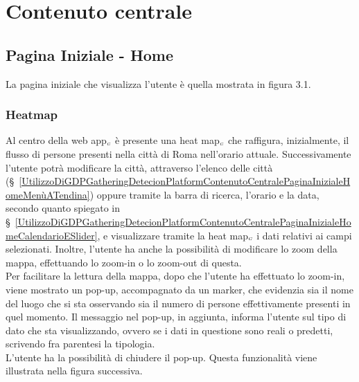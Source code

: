 \section{Contenuto centrale}\label{UtilizzoDiGDPGatheringDetecionPlatformContenutoCentrale}

\subsection{Pagina Iniziale - Home} \label{UtilizzoDiGDPGatheringDetecionPlatformContenutoCentralePaginaInizialeHome}
La pagina iniziale che visualizza l'utente è quella mostrata in figura 3.1.

\subsubsection{Heatmap}\label{UtilizzoDiGDPGatheringDetecionPlatformContenutoCentralePaginaInizialeHomeHeatmap}
Al centro della web app$_{\scaleto{G}{3pt}}$ è presente una heat map$_{\scaleto{G}{3pt}}$ che raffigura, inizialmente, il flusso di persone presenti nella città di Roma nell'orario attuale. Successivamente l'utente potrà modificare la città, attraverso l'elenco delle città (\S~\ref{UtilizzoDiGDPGatheringDetecionPlatformContenutoCentralePaginaInizialeHomeMenùATendina}) oppure tramite la barra di ricerca, l'orario e la data, secondo quanto spiegato in \S~\ref{UtilizzoDiGDPGatheringDetecionPlatformContenutoCentralePaginaInizialeHomeCalendarioESlider}, e visualizzare tramite la heat map$_{\scaleto{G}{3pt}}$ i dati relativi ai campi selezionati. Inoltre, l'utente ha anche la possibilità di modificare lo zoom della mappa, effettuando lo zoom-in o lo zoom-out di questa. \\
Per facilitare la lettura della mappa, dopo che l'utente ha effettuato lo zoom-in, viene mostrato un pop-up, accompagnato da un marker, che evidenzia sia il nome del luogo che si sta osservando sia il numero di persone effettivamente presenti in quel momento. Il messaggio nel pop-up, in aggiunta, informa l'utente sul tipo di dato che sta visualizzando, ovvero se i dati in questione sono reali o predetti, scrivendo fra parentesi la tipologia. \\
L'utente ha la possibilità di chiudere il pop-up. Questa funzionalità viene illustrata nella figura successiva.

